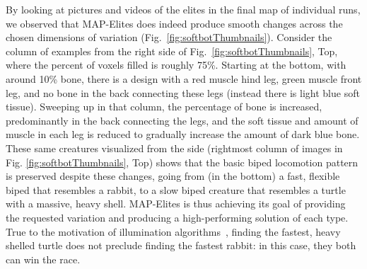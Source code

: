 \documentclass[twocolumn, DIV25, 9pt]{scrartcl}
\begin{document}
%
\begin{figure*}[ht!]
	\begin{center}
	\end{center}
	\caption{Example maps annotated with example organisms from different areas of the feature space. Within a map, MAP-Elites smoothly adapts a design theme along the desired dimensions of variation. Between maps, one can see that there is some variation between maps, both in the performance discovered at specific points, and in the types of solutions discovered. That said, in general each map generally paints the same overall picture of the performance capabilities of each region of the feature space. Note the different scale of the bottom color map. Additional example maps are shown in Fig.~\ref{fig:softbotsPlots}. Because videos do a better job of revealing the similarity and differences in these organisms, both in their body and their behavior, a future draft of the paper will include a video of these individuals.}
	\label{fig:softbotThumbnails}
\end{figure*}


By looking at pictures and videos of the elites in the final map of individual runs, we observed that MAP-Elites does indeed produce smooth changes across the chosen dimensions of variation (Fig.~\ref{fig:softbotThumbnails}). Consider the column of examples from the right side of Fig.~\ref{fig:softbotThumbnails}, Top, where the percent of voxels filled is roughly 75\%. Starting at the bottom, with around 10\% bone, there is a design with a red muscle hind leg, green muscle front leg, and no bone in the back connecting these legs (instead there is light blue soft tissue). Sweeping up in that column, the percentage of bone is increased, predominantly in the back connecting the legs, and the soft tissue and amount of muscle in each leg is reduced to gradually increase the amount of dark blue bone. These same creatures visualized from the side (rightmost column of images in Fig. \ref{fig:softbotThumbnails}, Top) shows that the basic biped locomotion pattern is preserved despite these changes, going from (in the bottom) a fast, flexible biped that resembles a rabbit, to a slow biped creature that resembles a turtle with a massive, heavy shell. MAP-Elites is thus achieving its goal of providing the requested variation and producing a high-performing solution of each type. True to the motivation of illumination algorithms~\cite{lehman2011evolving, clune2013originModularity}, finding the fastest, heavy shelled turtle does not preclude finding the fastest rabbit: in this case, they both can win the race. 
\end{document}
